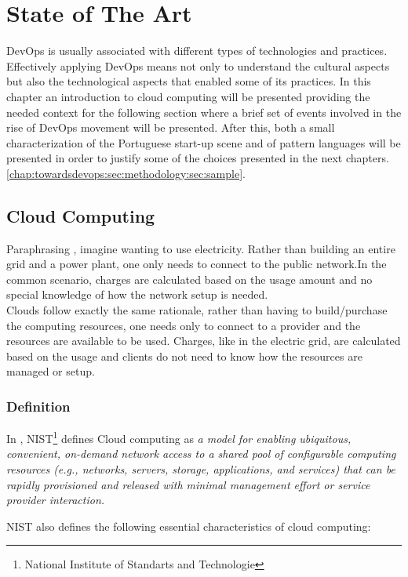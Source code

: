 \chapter{State of The Art} \label{chap:stateoftheart}
DevOps is usually associated with different types of technologies and practices. Effectively applying DevOps means not only to understand the cultural aspects but also the technological aspects that enabled some of its practices.
In this chapter an introduction to cloud computing will be presented providing the needed context for the following section where a brief set of events involved in the rise of DevOps movement will be presented. After this, both a small characterization of the Portuguese start-up scene and of pattern languages will be presented in order to justify some of the choices presented in the next chapters. \ref{chap:towardsdevops:sec:methodology:sec:sample}.

    \section{Cloud Computing} \label{chap:stateoftheart:sec:cloud}
    Paraphrasing \cite{Bass}, imagine  wanting to use electricity. Rather than building an entire grid and a power plant, one only needs to connect to the public network.In the common scenario, charges are calculated based on the usage amount and no special knowledge of how the network setup is needed.\\
    Clouds follow exactly the same rationale, rather than having to build/purchase the computing resources, one needs only to connect to a provider and the resources are available to be used. Charges, like in the electric grid, are calculated based on the usage and clients do not need to know how the resources are managed or setup.
        \subsection{Definition}
        In \cite{Mell2011}, NIST\footnote{National Institute of Standarts and Technologie} defines Cloud computing as \textit{a model for enabling ubiquitous, convenient, on-demand network access to a shared pool of configurable computing resources (e.g., networks, servers, storage, applications, and services) that can be rapidly provisioned and released with minimal management effort or service provider interaction.}

        NIST also defines the following essential characteristics of cloud computing:

